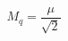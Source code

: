 \begin{equation}                              
M_{q} = \frac{\mu}{\sqrt{2}}                              
\end{equation} 
